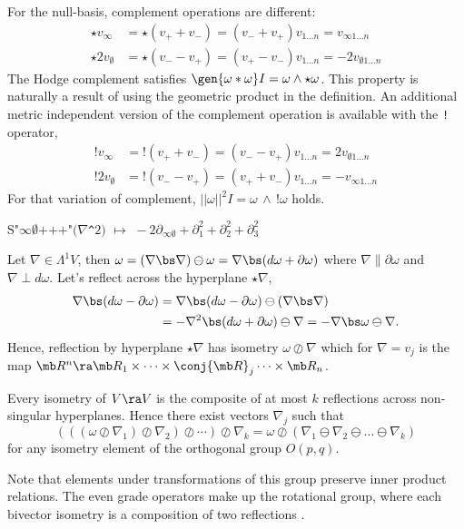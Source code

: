 \documentclass{juliacon}
\begin{document}

For the null-basis, complement operations are different:
\begin{align*}
	\star v_\infty &= \star(v_++v_-) = (v_- + v_+)v_{1...n} = v_{\infty1...n} \\
 	\star 2v_\emptyset &= \star(v_--v_+) = (v_+ - v_-)v_{1...n} = -2v_{\emptyset1...n}
\end{align*}
The Hodge complement satisfies $\gen{\omega\ast\omega}I=\omega\wedge\star\omega$. This property is naturally a result of using the geometric product in the definition.
An additional metric independent version of the complement operation is available with the \verb`!` operator,
\begin{align*}
	!v_\infty &= !(v_++v_-) = (v_- - v_+)v_{1...n} = 2v_{\emptyset1...n} \\
 	!2v_\emptyset &= !(v_--v_+) = (v_+ + v_-)v_{1...n} = -v_{\infty1...n}
\end{align*}
For that variation of complement, $||\omega||^2 I = \omega\,\wedge\,!\omega$ holds.
\begin{example}%
	S"$\infty\emptyset\text{+++"}(\nabla$\verb`^`$2) \,\,  \mapsto\, \, -2\partial_{\infty\emptyset} + \partial_1^2 + \partial_2^2 + \partial_3^2 $
\end{example}
Let $\nabla\in\Lambda^1V$, then $\omega = (\nabla\bs\nabla)\ominus\omega = \nabla\bs(d\omega + \partial\omega)$ where $\nabla\parallel\partial\omega$ and $\nabla\perp d\omega$.
Let's reflect across the hyperplane $\star\nabla$,
\begin{align*}
	\nabla\bs (d\omega-\partial\omega) &= \nabla\bs(d\omega-\partial\omega)\ominus(\nabla\bs\nabla) \\
									   &= -\nabla^2\bs(d\omega+\partial\omega)\ominus\nabla = -\nabla\bs\omega\ominus\nabla. %
\end{align*}
Hence, reflection by hyperplane $\star\nabla$ has isometry $\omega\oslash\nabla$ which for $\nabla = v_j$ is the map $\mb R^n \ra \mb R_1\times\cdots\times\conj{\mb R}_j\cdots\times\mb R_n$.

\begin{theorem}
	Every isometry of $V\ra V$ is the composite of at most $k$ reflections across non-singular hyperplanes. Hence there exist vectors $\nabla_j$ such that
	$$ (((\omega\oslash\nabla_1)\oslash\nabla_2)\oslash\cdots)\oslash\nabla_k = \omega\oslash(\nabla_1\ominus\nabla_2\ominus\dots\ominus\nabla_k) $$
	for any isometry element of the orthogonal group $O(p,q)$.
\end{theorem}
Note that elements under transformations of this group preserve inner product relations.
The even grade operators make up the rotational group, where each bivector isometry is a composition of two reflections \cite{artin} \cite{doran-hestenes-sommen-acker}.
\end{document}
